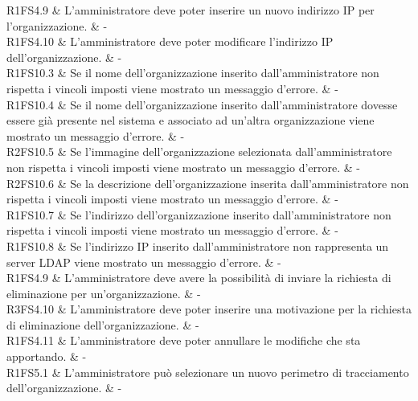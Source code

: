 R1FS4.9 & L'amministratore deve poter inserire un nuovo indirizzo IP per l'organizzazione.  & - \\

R1FS4.10 & L'amministratore deve poter modificare l'indirizzo IP dell'organizzazione.  & - \\

R1FS10.3 & Se il nome dell'organizzazione inserito dall'amministratore non rispetta i vincoli imposti viene mostrato un messaggio d'errore.  & - \\

R1FS10.4 & Se il nome dell'organizzazione inserito dall'amministratore dovesse essere già presente nel sistema e associato ad un'altra organizzazione viene mostrato un messaggio d'errore.  & - \\

R2FS10.5 & Se l'immagine dell'organizzazione selezionata dall'amministratore non rispetta i vincoli imposti viene mostrato un messaggio d'errore. & - \\

R2FS10.6 & Se la descrizione dell'organizzazione inserita dall'amministratore non rispetta i vincoli imposti viene mostrato un messaggio d'errore. & - \\

R1FS10.7 & Se l'indirizzo dell'organizzazione inserito dall'amministratore non rispetta i vincoli imposti viene mostrato un messaggio d'errore.  & - \\

R1FS10.8 & Se l'indirizzo IP inserito dall'amministratore non rappresenta un server LDAP viene mostrato un messaggio d'errore.  & - \\

R1FS4.9 & L'amministratore deve avere la possibilità di inviare la richiesta di eliminazione per un'organizzazione.  & - \\

R3FS4.10 & L'amministratore deve poter inserire una motivazione per la richiesta di eliminazione dell'organizzazione.  & - \\

R1FS4.11 & L'amministratore deve poter annullare le modifiche che sta apportando.  & - \\




R1FS5.1 & L'amministratore può selezionare un nuovo perimetro di tracciamento dell'organizzazione. & - \\

